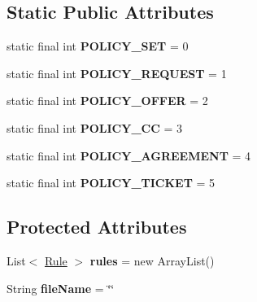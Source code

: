 \subsection*{Static Public Attributes}
\begin{DoxyCompactItemize}
\item 
\hypertarget{classodrlmodel_1_1_policy_ac21b03b084083baf13c68ae71cceabad}{static final int {\bfseries P\-O\-L\-I\-C\-Y\-\_\-\-S\-E\-T} = 0}\label{classodrlmodel_1_1_policy_ac21b03b084083baf13c68ae71cceabad}

\item 
\hypertarget{classodrlmodel_1_1_policy_ad9764f12c73e051fc961e2962a42e107}{static final int {\bfseries P\-O\-L\-I\-C\-Y\-\_\-\-R\-E\-Q\-U\-E\-S\-T} = 1}\label{classodrlmodel_1_1_policy_ad9764f12c73e051fc961e2962a42e107}

\item 
\hypertarget{classodrlmodel_1_1_policy_aea7a829bafc34b98a72cd344b8285bcc}{static final int {\bfseries P\-O\-L\-I\-C\-Y\-\_\-\-O\-F\-F\-E\-R} = 2}\label{classodrlmodel_1_1_policy_aea7a829bafc34b98a72cd344b8285bcc}

\item 
\hypertarget{classodrlmodel_1_1_policy_a0d7c3db4e146f25bf30b684efc962f18}{static final int {\bfseries P\-O\-L\-I\-C\-Y\-\_\-\-C\-C} = 3}\label{classodrlmodel_1_1_policy_a0d7c3db4e146f25bf30b684efc962f18}

\item 
\hypertarget{classodrlmodel_1_1_policy_ae11df1da254f43aae6418d0a71723103}{static final int {\bfseries P\-O\-L\-I\-C\-Y\-\_\-\-A\-G\-R\-E\-E\-M\-E\-N\-T} = 4}\label{classodrlmodel_1_1_policy_ae11df1da254f43aae6418d0a71723103}

\item 
\hypertarget{classodrlmodel_1_1_policy_a9c0b3d10c39931b9bb4f3656055b12e7}{static final int {\bfseries P\-O\-L\-I\-C\-Y\-\_\-\-T\-I\-C\-K\-E\-T} = 5}\label{classodrlmodel_1_1_policy_a9c0b3d10c39931b9bb4f3656055b12e7}

\end{DoxyCompactItemize}
\subsection*{Protected Attributes}
\begin{DoxyCompactItemize}
\item 
\hypertarget{classodrlmodel_1_1_policy_a78dc893b4b6be02dc15022f67431d9d4}{List$<$ \hyperlink{classodrlmodel_1_1_rule}{Rule} $>$ {\bfseries rules} = new Array\-List()}\label{classodrlmodel_1_1_policy_a78dc893b4b6be02dc15022f67431d9d4}

\item 
\hypertarget{classodrlmodel_1_1_policy_a2ee78152028a84149c0099df7d9e3d64}{String {\bfseries file\-Name} = \char`\"{}\char`\"{}}\label{classodrlmodel_1_1_policy_a2ee78152028a84149c0099df7d9e3d64}

\end{DoxyCompactItemize}
